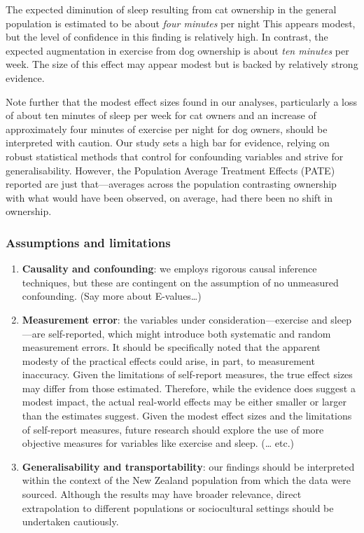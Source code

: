 \documentclass[
  singlecolumn,
  9pt]{article}
\begin{document}
The expected diminution of sleep resulting from cat ownership in the
general population is estimated to be about \emph{four minutes} per
night This appears modest, but the level of confidence in this finding
is relatively high. In contrast, the expected augmentation in exercise
from dog ownership is about \emph{ten minutes} per week. The size of
this effect may appear modest but is backed by relatively strong
evidence.

Note further that the modest effect sizes found in our analyses,
particularly a loss of about ten minutes of sleep per week for cat
owners and an increase of approximately four minutes of exercise per
night for dog owners, should be interpreted with caution. Our study sets
a high bar for evidence, relying on robust statistical methods that
control for confounding variables and strive for generalisability.
However, the Population Average Treatment Effects (PATE) reported are
just that---averages across the population contrasting ownership with
what would have been observed, on average, had there been no shift in
ownership.

\subsubsection{Assumptions and
limitations}\label{assumptions-and-limitations}

\begin{enumerate}
\def\labelenumi{\arabic{enumi}.}
\item
  \textbf{Causality and confounding}: we employs rigorous causal
  inference techniques, but these are contingent on the assumption of no
  unmeasured confounding. (Say more about E-values\ldots)
\item
  \textbf{Measurement error}: the variables under
  consideration---exercise and sleep---are self-reported, which might
  introduce both systematic and random measurement errors. It should be
  specifically noted that the apparent modesty of the practical effects
  could arise, in part, to measurement inaccuracy. Given the limitations
  of self-report measures, the true effect sizes may differ from those
  estimated. Therefore, while the evidence does suggest a modest impact,
  the actual real-world effects may be either smaller or larger than the
  estimates suggest. Given the modest effect sizes and the limitations
  of self-report measures, future research should explore the use of
  more objective measures for variables like exercise and sleep.
  (\ldots{} etc.)
\item
  \textbf{Generalisability and transportability}: our findings should be
  interpreted within the context of the New Zealand population from
  which the data were sourced. Although the results may have broader
  relevance, direct extrapolation to different populations or
  sociocultural settings should be undertaken cautiously.
\end{enumerate}
\end{document}
